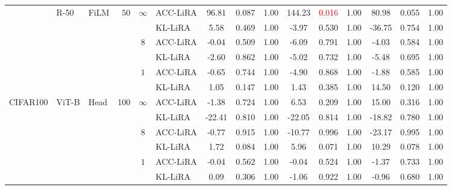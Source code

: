 \begin{table*}[!htb]
\begin{center}
{\begin{tabular}{lllrclccccccccc}
\cmidrule{2-15}
 &  \multirow{6}{*}{R-50} & \multirow{6}{*}{FiLM} & \multirow{6}{*}{$50$} & \multirow{2}{*}{$\infty$} & ACC-LiRA & 96.81 & 0.087 & 1.00 & 144.23 & \textcolor{red}{0.016} & 1.00 & 80.98 & 0.055 & 1.00 \\
 &  &  &  & & KL-LiRA & 5.58 & 0.469 & 1.00 & -3.97 & 0.530 & 1.00 & -36.75 & 0.754 & 1.00 \\
\cmidrule{5-15}
 &  &  &  & \multirow{2}{*}{$8$} & ACC-LiRA & -0.04 & 0.509 & 1.00 & -6.09 & 0.791 & 1.00 & -4.03 & 0.584 & 1.00 \\
 &  &  &  &  & KL-LiRA & -2.60 & 0.862 & 1.00 & -5.02 & 0.732 & 1.00 & -5.48 & 0.695 & 1.00 \\
\cmidrule{5-15}
 &  &  &  & \multirow{2}{*}{$1$} & ACC-LiRA & -0.65 & 0.744 & 1.00 & -4.90 & 0.868 & 1.00 & -1.88 & 0.585 & 1.00 \\
 &  &  &  &  & KL-LiRA & 1.05 & 0.147 & 1.00 & 1.43 & 0.385 & 1.00 & 14.50 & 0.120 & 1.00 \\
 
\cmidrule{1-15}
\multirow{6}{*}{CIFAR100} & \multirow{6}{*}{ViT-B} & \multirow{6}{*}{Head} & \multirow{6}{*}{100} & \multirow{2}{*}{$\infty$} & ACC-LiRA & -1.38 & 0.724 & 1.00 & 6.53 & 0.209 & 1.00 & 15.00 & 0.316 & 1.00 \\
 &  &  &  & & KL-LiRA & -22.41 & 0.810 & 1.00 & -22.05 & 0.814 & 1.00 & -18.82 & 0.780 & 1.00 \\
\cmidrule{5-15}
 &  &  &  & \multirow{2}{*}{$8$} & ACC-LiRA & -0.77 & 0.915 & 1.00 & -10.77 & 0.996 & 1.00 & -23.17 & 0.995 & 1.00 \\
 &  &  &  &  & KL-LiRA & 1.72 & 0.084 & 1.00 & 5.96 & 0.071 & 1.00 & 10.29 & 0.078 & 1.00 \\
\cmidrule{5-15}
 &  &  &  & \multirow{2}{*}{$1$} & ACC-LiRA & -0.04 & 0.562 & 1.00 & -0.04 & 0.524 & 1.00 & -1.37 & 0.733 & 1.00 \\
 &  &  &  &  & KL-LiRA & 0.09 & 0.306 & 1.00 & -1.06 & 0.922 & 1.00 & -0.96 & 0.680 & 1.00 \\

\bottomrule
\end{tabular}}
\end{center}
\end{table*}
